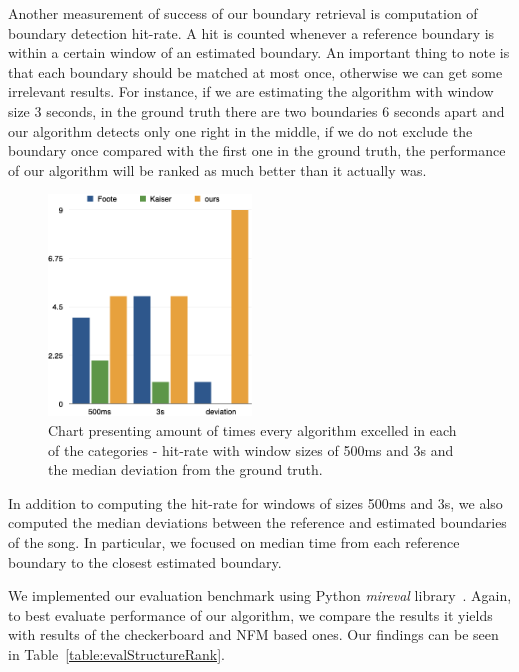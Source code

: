 Another measurement of success of our boundary retrieval is computation of boundary detection hit-rate. A hit is counted whenever a reference boundary is within a certain window of an estimated boundary. An important thing to note is that each boundary should be matched at most once, otherwise we can get some irrelevant results. For instance, if we are estimating the algorithm with window size 3 seconds, in the ground truth there are two boundaries 6 seconds apart and our algorithm detects only one right in the middle, if we do not exclude the boundary once compared with the first one in the ground truth, the performance of our algorithm will be ranked as much better than it actually was. 

\begin{figure}
\vspace{-30pt}
  \begin{center}
    \includegraphics[width=0.48\textwidth]{Figures/structurechamps}
  \end{center}
  \caption{Chart presenting amount of times every algorithm excelled in each of the categories - hit-rate with window sizes of 500ms and 3s and the median deviation from the ground truth.}
\label{fig:structurechamps}
\end{figure}


In addition to computing the hit-rate for windows of sizes 500ms and 3s, we also computed the median deviations between the reference and estimated boundaries of the song. In particular, we focused on median time from each reference boundary to the closest estimated boundary.

We implemented our evaluation benchmark using Python \textit{mir\textunderscore eval} library~\cite{mireval}.
Again, to best evaluate performance of our algorithm, we compare the results it yields with results of the checkerboard and NFM based ones. Our findings can be seen in Table~\ref{table:evalStructureRank}.


